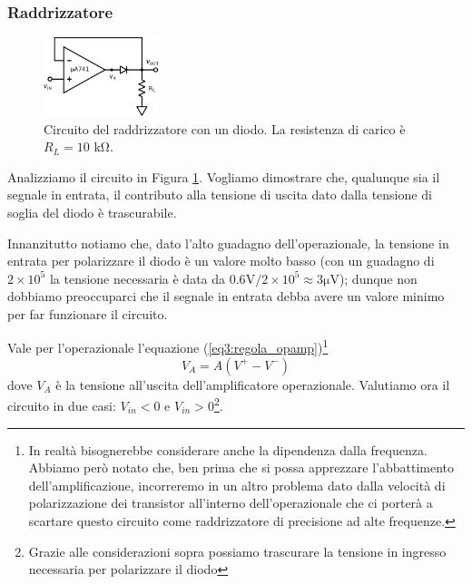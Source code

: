 \subsubsection{Raddrizzatore}

\begin{figure}
  \begin{center}
    \includegraphics[width=0.30\textwidth]{../E05/latex/c_rectifier_A.pdf}
  \end{center}
  \caption{Circuito del raddrizzatore con un diodo. La resistenza di carico è $R_L=10$ \si{\kilo\ohm}.}
  \label{cir5:raddrizz_1}
\end{figure}

Analizziamo il circuito in Figura \ref{cir5:raddrizz_1}. Vogliamo dimostrare che, qualunque sia il segnale in entrata, il contributo alla tensione di uscita dato dalla tensione di soglia del diodo è trascurabile.

Innanzitutto notiamo che, dato l'alto guadagno dell'operazionale, la tensione in entrata per polarizzare il diodo è un valore molto basso (con un guadagno di $2\times 10^5$ la tensione necessaria è data da $0.6 \si{\volt}/2\times 10^5 \approx 3 \si{\micro\volt}$); dunque non dobbiamo preoccuparci che il segnale in entrata debba avere un valore minimo per far funzionare il circuito.

Vale per l'operazionale l'equazione (\ref{eq3:regola_opamp})\footnote{In realtà bisognerebbe considerare anche la dipendenza dalla frequenza. Abbiamo però notato che, ben prima che si possa apprezzare l'abbattimento dell'amplificazione, incorreremo in un altro problema dato dalla velocità di polarizzazione dei transistor all'interno dell'operazionale che ci porterà a scartare questo circuito come raddrizzatore di precisione ad alte frequenze.}
\begin{equation}
V_{A}=A (V^+-V^-)
\label{eq5:regola_opamp_NOFREQDEP}
\end{equation}
dove $V_{A}$ è la tensione all'uscita dell'amplificatore operazionale.
Valutiamo ora il circuito in due casi: $V_{in}<0$ e $V_{in}>0$\footnote{Grazie alle considerazioni sopra possiamo trascurare la tensione in ingresso necessaria per polarizzare il diodo}.

